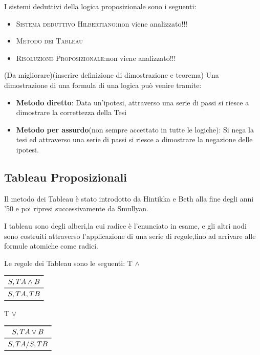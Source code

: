 \begin{enumerate}
I sistemi deduttivi della logica proposizionale sono i seguenti:

\begin{itemize}
  \item \textsc{Sistema deduttivo Hilbertiano}:non viene analizzato!!!
  \item \textsc{Metodo dei Tableau}
  \item \textsc{Risoluzione Proposizionale}:non viene analizzato!!!
\end{itemize}

(Da migliorare)(inserire definizione di dimostrazione e teorema)
Una dimostrazione di una formula di una logica può venire tramite:

\begin{itemize}
  \item  \textbf{Metodo diretto}: Data un'ipotesi, attraverso una serie di passi
          si riesce a dimostrare la correttezza della Tesi
  \item \textbf{Metodo per assurdo}(non sempre accettato in tutte le logiche):
        Si nega la tesi ed attraverso una serie di passi si riesce a dimostrare
        la negazione delle ipotesi.
\end{itemize}

\subsection{Tableau Proposizionali}
Il metodo dei Tableau è stato introdotto da Hintikka e Beth alla fine degli anni '50
e poi ripresi successivamente da Smullyan.

I tableau sono degli alberi,la cui radice è l'enunciato in esame, e gli altri nodi
sono costruiti attraverso l'applicazione di una serie di regole,fino ad arrivare
alle formule atomiche come radici.

Le regole dei Tableau sono le seguenti:\newline
T $\land$

$\begin{array}{c}
\toprule
S,T A \land B \\
\midrule
S, TA, TB \\
\bottomrule
\end{array}$

T $\lor$

$\begin{array}{c}
\toprule
S,T A \lor B \\
\midrule
S, TA/ S, TB \\
\bottomrule
\end{array}$


\end{enumerate}
